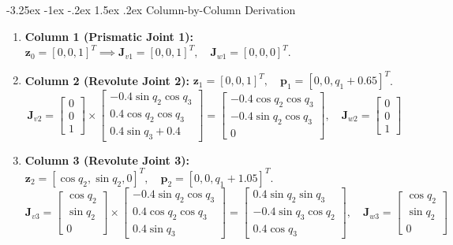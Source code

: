 \documentclass[11pt, a4paper]{article}
\makeatletter
\renewcommand{\subsection}{\@startsection{subsection}{2}{\z@}%
    {-3.25ex \@plus -1ex \@minus -.2ex}%
    {1.5ex \@plus .2ex}%
    {\normalfont\large\bfseries\color{brandaccent}}}
\makeatother
\begin{document}
\subsection{Column-by-Column Derivation}
\begin{enumerate}[leftmargin=1.5em]
    \item \textbf{Column 1 (Prismatic Joint 1):}
    $\mathbf{z}_0 = [0, 0, 1]^T \implies \mathbf{J}_{v1} = [0, 0, 1]^T, \quad \mathbf{J}_{w1} = [0, 0, 0]^T$.

    \item \textbf{Column 2 (Revolute Joint 2):}
    $\mathbf{z}_1 = [0, 0, 1]^T, \quad \mathbf{p}_1 = [0, 0, q_1 + 0.65]^T$.
    \begin{equation}
        \mathbf{J}_{v2} = \begin{bmatrix} 0 \\ 0 \\ 1 \end{bmatrix} \times \begin{bmatrix} -0.4 \sin q_2 \cos q_3 \\ 0.4 \cos q_2 \cos q_3 \\ 0.4 \sin q_3 + 0.4 \end{bmatrix} = \begin{bmatrix} -0.4 \cos q_2 \cos q_3 \\ -0.4 \sin q_2 \cos q_3 \\ 0 \end{bmatrix}, \quad \mathbf{J}_{w2} = \begin{bmatrix} 0 \\ 0 \\ 1 \end{bmatrix}
    \end{equation}

    \item \textbf{Column 3 (Revolute Joint 3):}
    $\mathbf{z}_2 = [\cos q_2, \sin q_2, 0]^T, \quad \mathbf{p}_2 = [0, 0, q_1 + 1.05]^T$.
    \begin{equation}
        \mathbf{J}_{v3} = \begin{bmatrix} \cos q_2 \\ \sin q_2 \\ 0 \end{bmatrix} \times \begin{bmatrix} -0.4 \sin q_2 \cos q_3 \\ 0.4 \cos q_2 \cos q_3 \\ 0.4 \sin q_3 \end{bmatrix} = \begin{bmatrix} 0.4 \sin q_2 \sin q_3 \\ -0.4 \sin q_3 \cos q_2 \\ 0.4 \cos q_3 \end{bmatrix}, \quad \mathbf{J}_{w3} = \begin{bmatrix} \cos q_2 \\ \sin q_2 \\ 0 \end{bmatrix}
    \end{equation}
\end{enumerate}
\end{document}
